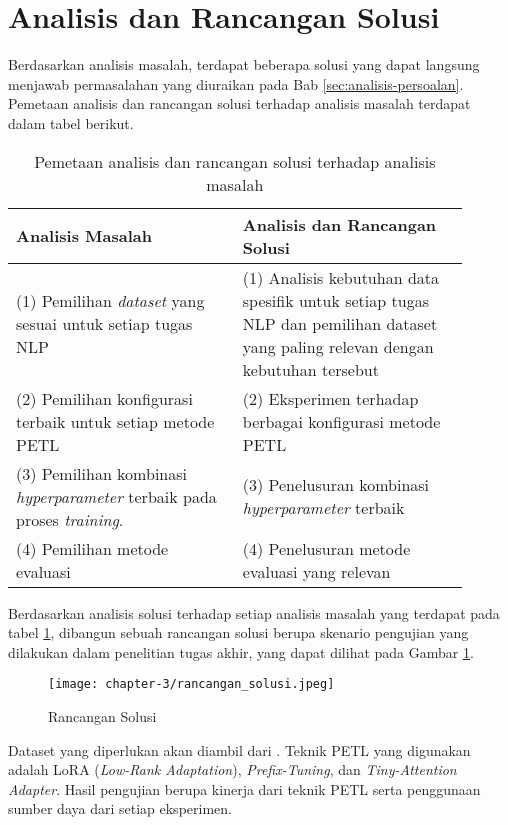 \section{Analisis dan Rancangan Solusi}

Berdasarkan analisis masalah, terdapat beberapa solusi yang dapat langsung menjawab permasalahan yang diuraikan pada Bab \ref{sec:analisis-persoalan}. Pemetaan analisis dan rancangan solusi terhadap analisis masalah terdapat dalam tabel berikut.

\begin{table}[h!]
    \centering
    \begin{tabular}{|m{0.45\linewidth}|m{0.45\linewidth}|}
    \hline
    \rowcolor{black!10}
    \textbf{Analisis Masalah} & \textbf{Analisis dan Rancangan Solusi} \\ \hline
    (1) Pemilihan \textit{dataset} yang sesuai untuk setiap tugas NLP & (1) Analisis kebutuhan data spesifik untuk setiap tugas NLP dan pemilihan dataset yang paling relevan dengan kebutuhan tersebut\\ \hline
    (2) Pemilihan konfigurasi terbaik untuk setiap metode PETL & (2) Eksperimen terhadap berbagai konfigurasi metode PETL \\ \hline
    (3) Pemilihan kombinasi \textit{hyperparameter} terbaik pada proses \textit{training}. & (3) Penelusuran kombinasi \textit{hyperparameter} terbaik\\ \hline
    (4) Pemilihan metode evaluasi & (4) Penelusuran metode evaluasi yang relevan \\ \hline
    \end{tabular}
\caption{Pemetaan analisis dan rancangan solusi terhadap analisis masalah}
\label{table:pemetaan-masalah-solusi}
\end{table}

Berdasarkan analisis solusi terhadap setiap analisis masalah yang terdapat pada tabel \ref{table:pemetaan-masalah-solusi}, dibangun sebuah rancangan solusi berupa skenario pengujian yang dilakukan dalam penelitian tugas akhir, yang dapat dilihat pada Gambar \ref{fig:rancangan-solusi}.

\begin{figure}[ht]
    \centering
    \texttt{[image: chapter-3/rancangan\_solusi.jpeg]}
    \caption{Rancangan Solusi}
    \label{fig:rancangan-solusi}
\end{figure}

Dataset yang diperlukan akan diambil dari \cite{nusacatalogue}. Teknik PETL yang digunakan adalah LoRA (\textit{Low-Rank Adaptation}), \textit{Prefix-Tuning}, dan \textit{Tiny-Attention Adapter}. Hasil pengujian berupa kinerja dari teknik PETL serta penggunaan sumber daya dari setiap eksperimen.